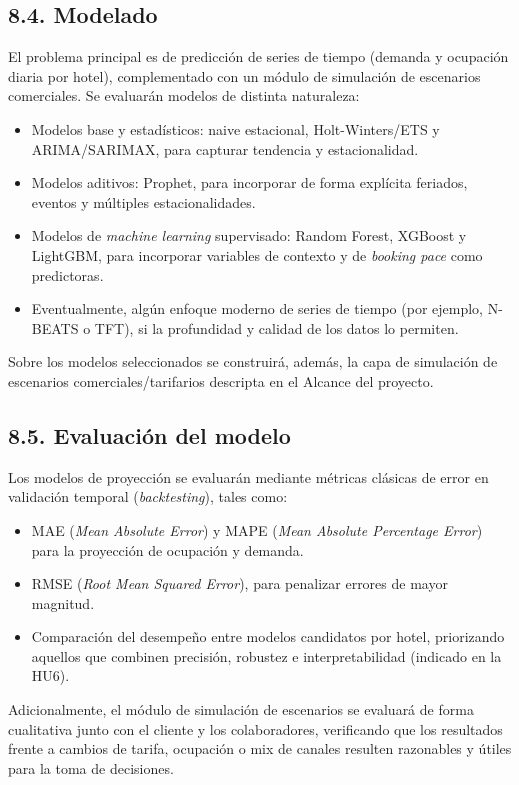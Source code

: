 \documentclass[
11pt, %
]{charter}
\begin{document}
\subsection*{8.4. Modelado}
El problema principal es de predicción de series de tiempo (demanda y ocupación diaria por hotel), complementado con un módulo de simulación de escenarios comerciales. Se evaluarán modelos de distinta naturaleza:
\begin{itemize}
  \item Modelos base y estadísticos: naive estacional, Holt-Winters/ETS y ARIMA/SARIMAX, para capturar tendencia y estacionalidad.
  \item Modelos aditivos: Prophet, para incorporar de forma explícita feriados, eventos y múltiples estacionalidades.
  \item Modelos de \textit{machine learning} supervisado: Random Forest, XGBoost y LightGBM, para incorporar variables de contexto y de \textit{booking pace} como predictoras.
  \item Eventualmente, algún enfoque moderno de series de tiempo (por ejemplo, N-BEATS o TFT), si la profundidad y calidad de los datos lo permiten.
\end{itemize}
Sobre los modelos seleccionados se construirá, además, la capa de simulación de escenarios comerciales/tarifarios descripta en el Alcance del proyecto.

\subsection*{8.5. Evaluación del modelo}
Los modelos de proyección se evaluarán mediante métricas clásicas de error en validación temporal (\textit{backtesting}), tales como:
\begin{itemize}
  \item MAE (\textit{Mean Absolute Error}) y MAPE (\textit{Mean Absolute Percentage Error}) para la proyección de ocupación y demanda.
  \item RMSE (\textit{Root Mean Squared Error}), para penalizar errores de mayor magnitud.
  \item Comparación del desempeño entre modelos candidatos por hotel, priorizando aquellos que combinen precisión, robustez e interpretabilidad (indicado en la HU6).
\end{itemize}
Adicionalmente, el módulo de simulación de escenarios se evaluará de forma cualitativa junto con el cliente y los colaboradores, verificando que los resultados frente a cambios de tarifa, ocupación o mix de canales resulten razonables y útiles para la toma de decisiones.
\end{document}
